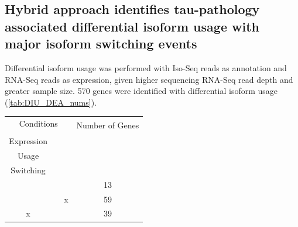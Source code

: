 \subsection{Hybrid approach identifies tau-pathology associated differential isoform usage with major isoform switching events}
Differential isoform usage was performed with Iso-Seq reads as annotation and RNA-Seq reads as expression, given higher sequencing RNA-Seq read depth and greater sample size. 570 genes were identified with differential isoform usage (\cref{tab:DIU_DEA_nums}). 

\vspace{1cm}
\begin{table}[!htp]
	\centering
	\begin{tabularx}{0.85\textwidth}{cccc}
		\toprule
		\multicolumn{3}{c}{Conditions}                                                                                                                                                                                       & \multirow{2}{*}{Number of Genes} \\ \cmidrule(r){1-3}
		\begin{tabular}[c]{@{}c@{}}Differential Gene\\  Expression\end{tabular} & \begin{tabular}[c]{@{}c@{}}Differential Isoform \\ Usage\end{tabular} & \begin{tabular}[c]{@{}c@{}}Isoform Major\\  Switching\end{tabular} &                                  \\ \midrule
		\checkmark                                                                      & \checkmark                                                                    & \checkmark                                                                 & 13                               \\
		\checkmark                                                                      & \checkmark                                                                    & x                                                                  & 59                               \\
		x                                                                       & \checkmark                                                                    & \checkmark                                                                 & 39                               \\

\end{tabularx}
\end{table}
